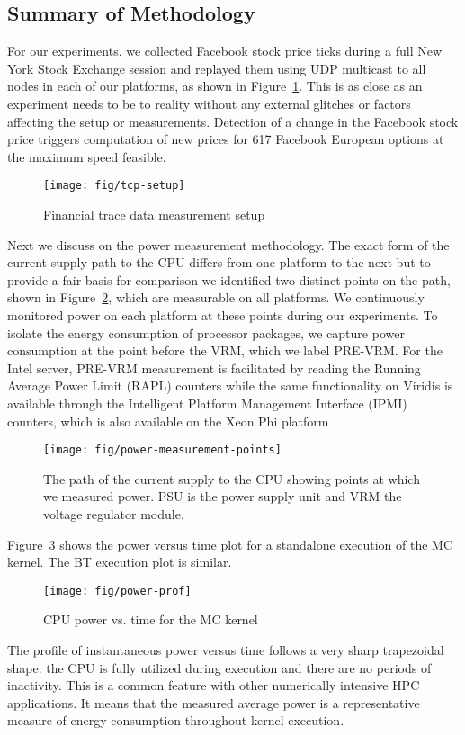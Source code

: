 \subsection{Summary of Methodology}  \label{sec:platforms:methodology}
For our experiments, we collected Facebook stock price ticks during a 
full New York Stock Exchange session and replayed them using UDP 
multicast to all nodes in each of our platforms, as shown in 
Figure~\ref{fig:fig1}. This is as close as an experiment 
needs to be to reality without any external glitches or factors 
affecting the setup or measurements. 
Detection of a change in the Facebook stock price triggers computation 
of new prices for 617 Facebook European options at the maximum speed 
feasible.
\begin{figure}[htbp]
  \centering
  \texttt{[image: fig/tcp-setup]}
  \caption{Financial trace data measurement setup}
 \label{fig:fig1}
\end{figure}
\par
Next we discuss on the power measurement methodology.
The exact form of the current supply path to the CPU differs from one 
platform to the next but to provide a fair basis for comparison 
we identified two distinct points on the path,
shown in Figure~\ref{fig:currentsupplypath}, which are measurable 
on all platforms. We continuously monitored power on each platform
at these points during our experiments. 
To isolate the energy consumption of processor packages, we capture 
power consumption at the point before the VRM, which we label PRE-VRM. 
For the Intel server, PRE-VRM measurement
is facilitated by reading the Running Average Power Limit (RAPL) 
counters while the same
functionality on Viridis is available through the Intelligent 
Platform Management Interface (IPMI)
counters, which is also available on the Xeon Phi platform
\begin{figure}[htbp]
  \centering
  \texttt{[image: fig/power-measurement-points]}
  \caption{The path of the current supply to the CPU showing points at which
           we measured power. PSU is the power supply unit and VRM the 
           voltage regulator module.}
  \label{fig:currentsupplypath}
\end{figure}
\par
Figure~\ref{fig:powervstime} shows the power versus time plot for a
standalone execution of the MC kernel. The BT execution plot is similar. 
\begin{figure}[htbp]
   \centering
   \texttt{[image: fig/power-prof]}
   \caption{CPU power vs. time for the MC kernel}
   \label{fig:powervstime}
\end{figure}
The profile of instantaneous power versus time follows 
a very sharp trapezoidal shape: the CPU is fully utilized during execution and 
there are no periods of inactivity. This is a common feature with other 
numerically intensive HPC applications. It means that the measured 
average power is a representative measure of energy consumption 
throughout kernel execution. 
